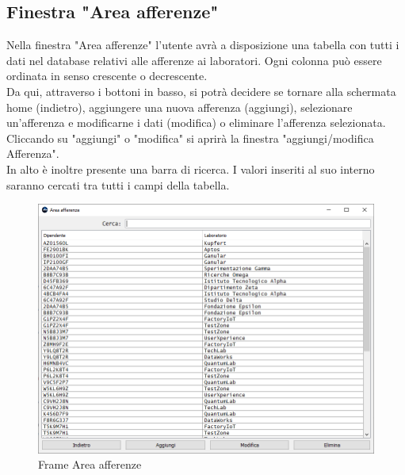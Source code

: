         \subsection {Finestra "Area afferenze"}
            Nella finestra "Area afferenze" l'utente avrà a disposizione una tabella con tutti i dati nel database relativi alle afferenze ai laboratori. Ogni colonna può essere ordinata in senso crescente o decrescente.\\
            Da qui, attraverso i bottoni in basso, si potrà decidere se tornare alla schermata home (indietro), aggiungere una nuova afferenza (aggiungi), selezionare un'afferenza e modificarne i dati (modifica) o eliminare l'afferenza selezionata. Cliccando su "aggiungi" o "modifica" si aprirà la finestra "aggiungi/modifica Afferenza".\\
            In alto è inoltre presente una barra di ricerca. I valori inseriti al suo interno saranno cercati tra tutti i campi della tabella.
            \begin{figure}[htbp!]
                \centering
                    \vspace{2\baselineskip}
                    \includegraphics[width=0.9\linewidth]{Immagini/Frames/Frame Area/Frame Area afferenze.png}
                \caption{Frame Area afferenze}
                \label{fig:Frame Area afferenze}
            \end{figure}

    \newpage

